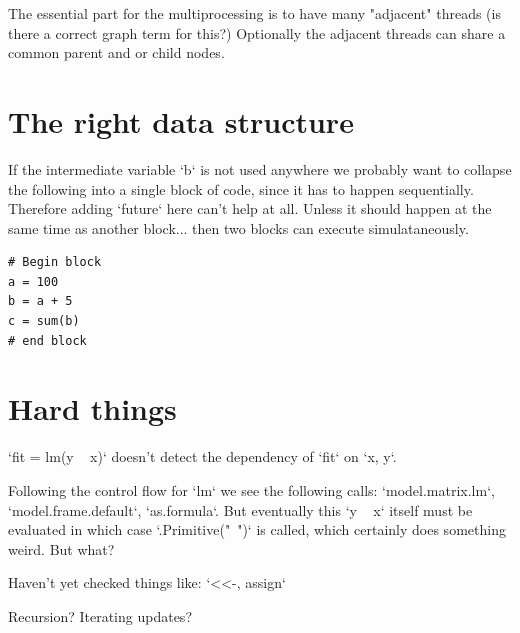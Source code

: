 \documentclass[12pt]{article}
\begin{document}
The essential part for the multiprocessing is to have many "adjacent"
threads (is there a correct graph term for this?)
Optionally the adjacent threads can share a common parent and or child
nodes.

\section{The right data structure}

If the intermediate variable `b` is not used anywhere we probably want to
collapse the following into a single block of code, since it has to happen
sequentially. Therefore adding `future` here can't help at all. Unless it
should happen at the same time as another block... then two blocks can
execute simulataneously.

\begin{verbatim}
# Begin block
a = 100
b = a + 5
c = sum(b)
# end block
\end{verbatim}

\section{Hard things}

`fit = lm(y ~ x)` doesn't detect the dependency of `fit` on `x, y`.

Following the control flow for `lm` we see the following calls:
`model.matrix.lm`, `model.frame.default`, `as.formula`. But eventually this
`y ~ x` itself must be evaluated in which case `.Primitive("~")` is called,
which certainly does something weird. But what?

Haven't yet checked things like:
`<<-, assign`

Recursion? Iterating updates?

\newpage


 
\end{document}
